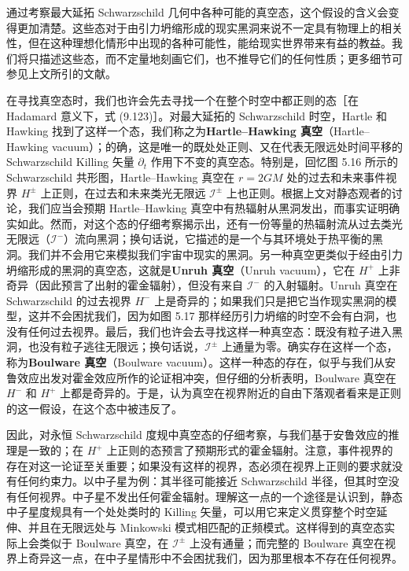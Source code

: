 通过考察最大延拓 Schwarzschild 几何中各种可能的真空态，这个假设的含义会变得更加清楚。这些态对于由引力坍缩形成的现实黑洞来说不一定具有物理上的相关性，但在这种理想化情形中出现的各种可能性，能给现实世界带来有益的教益。我们将只描述这些态，而不定量地刻画它们，也不推导它们的任何性质；更多细节可参见上文所引的文献。

在寻找真空态时，我们也许会先去寻找一个在整个时空中都正则的态［在 Hadamard 意义下，式 (9.123)］。对最大延拓的 Schwarzschild 时空，Hartle 和 Hawking 找到了这样一个态，我们称之为\textbf{Hartle--Hawking 真空}（Hartle--Hawking vacuum）；的确，这是唯一的既处处正则、又在代表无限远处时间平移的 Schwarzschild Killing 矢量 $\partial_{t}$ 作用下不变的真空态。特别是，回忆图 5.16 所示的 Schwarzschild 共形图，Hartle--Hawking 真空在 $r = 2GM$ 处的过去和未来事件视界 $H^{\pm}$ 上正则，在过去和未来类光无限远 $\mathscr{I}^{\pm}$ 上也正则。根据上文对静态观者的讨论，我们应当会预期 Hartle--Hawking 真空中有热辐射从黑洞发出，而事实证明确实如此。然而，对这个态的仔细考察揭示出，还有一份等量的热辐射流从过去类光无限远（$\mathscr{I}^{-}$）流向黑洞；换句话说，它描述的是一个与其环境处于热平衡的黑洞。我们并不会用它来模拟我们宇宙中现实的黑洞。另一种真空更类似于经由引力坍缩形成的黑洞的真空态，这就是\textbf{Unruh 真空}（Unruh vacuum），它在 $H^{+}$ 上非奇异（因此预言了出射的霍金辐射），但没有来自 $\mathscr{I}^{-}$ 的入射辐射。Unruh 真空在 Schwarzschild 的过去视界 $H^{-}$ 上是奇异的；如果我们只是把它当作现实黑洞的模型，这并不会困扰我们，因为如图 5.17 那样经历引力坍缩的时空不会有白洞，也没有任何过去视界。最后，我们也许会去寻找这样一种真空态：既没有粒子进入黑洞，也没有粒子逃往无限远；换句话说，$\mathscr{I}^{\pm}$ 上通量为零。确实存在这样一个态，称为\textbf{Boulware 真空}（Boulware vacuum）。这样一种态的存在，似乎与我们从安鲁效应出发对霍金效应所作的论证相冲突，但仔细的分析表明，Boulware 真空在 $H^{-}$ 和 $H^{+}$ 上都是奇异的。于是，认为真空在视界附近的自由下落观者看来是正则的这一假设，在这个态中被违反了。

因此，对永恒 Schwarzschild 度规中真空态的仔细考察，与我们基于安鲁效应的推理是一致的；在 $H^{+}$ 上正则的态预言了预期形式的霍金辐射。注意，事件视界的存在对这一论证至关重要；如果没有这样的视界，态必须在视界上正则的要求就没有任何约束力。以中子星为例：其半径可能接近 Schwarzschild 半径，但其时空没有任何视界。中子星不发出任何霍金辐射。理解这一点的一个途径是认识到，静态中子星度规具有一个处处类时的 Killing 矢量，可以用它来定义贯穿整个时空延伸、并且在无限远处与 Minkowski 模式相匹配的正频模式。这样得到的真空态实际上会类似于 Boulware 真空，在 $\mathscr{I}^{\pm}$ 上没有通量；而完整的 Boulware 真空在视界上奇异这一点，在中子星情形中不会困扰我们，因为那里根本不存在任何视界。


